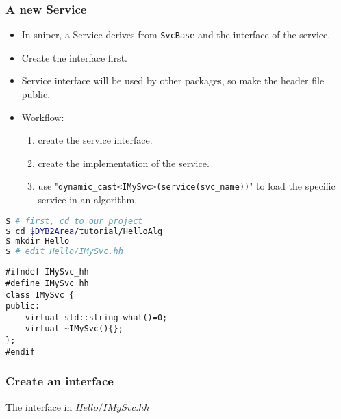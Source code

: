 
\begin{frame}
    \frametitle{A new Service}
    \begin{itemize}
        \item In sniper, a Service derives from {\tt SvcBase} and 
                the interface of the service.
        \item Create the interface first. 
        \item Service interface will be used by other packages, so make the 
                header file public.
        \item Workflow:
        \begin{enumerate}
            \item create the service interface.
            \item create the implementation of the service.
            \item use "{\tt dynamic\_cast<IMySvc>(service(svc\_name))}"
                  to load the specific service in an algorithm.
        \end{enumerate}
    \end{itemize}
\end{frame}

\newsavebox{\createinterface}
\begin{lrbox}{\createinterface}
\begin{lstlisting}[language=bash]
$ # first, cd to our project
$ cd $DYB2Area/tutorial/HelloAlg
$ mkdir Hello 
$ # edit Hello/IMySvc.hh
\end{lstlisting}
\end{lrbox}

\newsavebox{\createinterfaceheader}
\begin{lrbox}{\createinterfaceheader}
\begin{lstlisting}
#ifndef IMySvc_hh
#define IMySvc_hh
class IMySvc {
public:
    virtual std::string what()=0;
    virtual ~IMySvc(){};
};
#endif
\end{lstlisting}
\end{lrbox}

\begin{frame}
    \frametitle{Create an interface}
    \par\usebox{\createinterface}
    \begin{block}{The interface in \(Hello/IMySvc.hh\)}
    \par\usebox{\createinterfaceheader}
    \end{block}
\end{frame}

